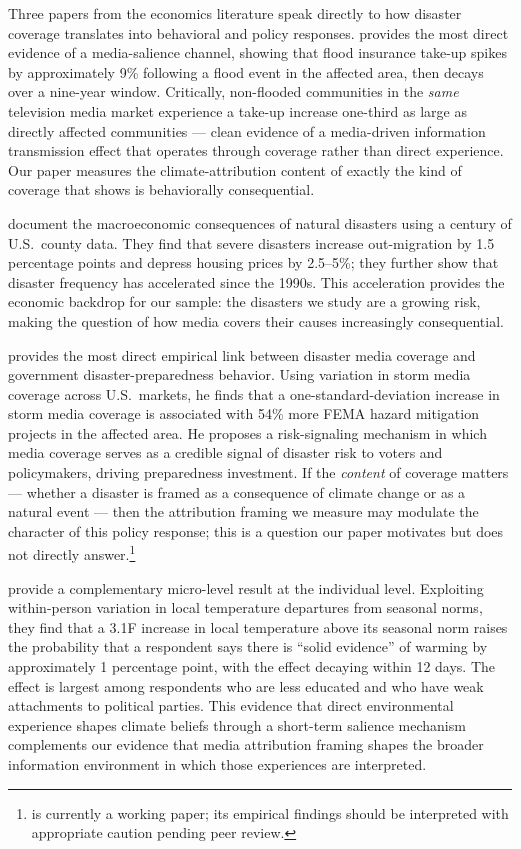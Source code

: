 \documentclass[12pt]{article}
\begin{document}
Three papers from the economics literature speak directly to how disaster
coverage translates into behavioral and policy responses.
\citet{gallagher2014} provides the most direct evidence of a
media-salience channel, showing that flood insurance take-up spikes by
approximately 9\% following a flood event in the affected area, then
decays over a nine-year window.  Critically, non-flooded communities in
the \emph{same} television media market experience a take-up increase
one-third as large as directly affected communities --- clean evidence of
a media-driven information transmission effect that operates through
coverage rather than direct experience.  Our paper measures the
climate-attribution content of exactly the kind of coverage that
\citet{gallagher2014} shows is behaviorally consequential.

\citet{boustan2020} document the macroeconomic consequences of natural
disasters using a century of U.S.\ county data.  They find that severe
disasters increase out-migration by 1.5 percentage points and depress
housing prices by 2.5--5\%; they further show that disaster frequency
has accelerated since the 1990s.  This acceleration provides the
economic backdrop for our sample: the disasters we study are a growing
risk, making the question of how media covers their causes increasingly
consequential.

\citet{magontier2020} provides the most direct empirical link between
disaster media coverage and government disaster-preparedness behavior.
Using variation in storm media coverage across U.S.\ markets, he finds
that a one-standard-deviation increase in storm media coverage is
associated with 54\% more FEMA hazard mitigation projects in the
affected area.  He proposes a risk-signaling mechanism in which media
coverage serves as a credible signal of disaster risk to voters and
policymakers, driving preparedness investment.  If the \emph{content}
of coverage matters --- whether a disaster is framed as a consequence of
climate change or as a natural event --- then the attribution framing
we measure may modulate the character of this policy response; this is
a question our paper motivates but does not directly
answer.\footnote{\citet{magontier2020} is currently a working paper;
its empirical findings should be interpreted with appropriate caution
pending peer review.}

\citet{egan2012} provide a complementary micro-level result at the
individual level.  Exploiting within-person variation in local
temperature departures from seasonal norms, they find that a
3.1\textdegree F increase in local temperature above its seasonal norm
raises the probability that a respondent says there is ``solid
evidence'' of warming by approximately 1 percentage point, with the
effect decaying within 12 days.  The effect is largest among respondents
who are less educated and who have weak attachments to political parties.
This evidence that direct environmental experience shapes climate beliefs
through a short-term salience mechanism complements our evidence that
media attribution framing shapes the broader information environment
in which those experiences are interpreted.
\end{document}
